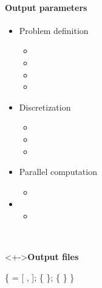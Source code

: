 
\begin{frame}[fragile] 
\secframetitle{\ssParameters}
\framesubtitle{Output parameters}
\vspace{-0.2in}
\begin{minipage}[t]{1.7in}
\begin{itemize}
\item Problem definition
  \begin{itemize}
  \item {}
  \item {}
  \item {}
  \item {}
  \end{itemize}
\item Discretization
  \begin{itemize}
  \item {}
  \item {}
  \item {}
  \end{itemize}
\item Parallel computation
  \begin{itemize}
  \item {}
  \end{itemize}
\item {}
  \begin{itemize}
    \item {}
  \end{itemize}
\end{itemize}
\end{minipage} \
\begin{minipage}[t]{2.6in}
\vspace{-0.2in}
 \begin{block}<+->{\textbf{Output files}}
 \footnotesize \vspace{-0.1in}
\begin{semiverbatim}
 \{
    = [ ,  ];
   \subgroup{de_hdf5} \{
   \};
    \{
   \}
\}
\end{semiverbatim}
 \end{block}
 \end{minipage}
\end{frame}
 
